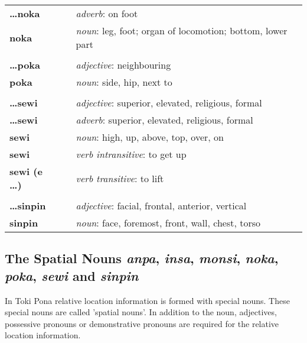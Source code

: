 \begin{supertabular}{p{2,5cm}|ll}
    \textbf{ \dots noka }   &  & \textit{adverb}: on foot                                                          \\
    \textbf{noka}           &  & \textit{noun}: leg, foot; organ of locomotion; bottom, lower part                 \\
                            &  &                                                                                   \\
    \textbf{\dots poka}     &  & \textit{adjective}: neighbouring                                                  \\
    \textbf{poka}           &  & \textit{noun}: side, hip, next to                                                 \\
                            &  &                                                                                   \\
    \textbf{\dots sewi}     &  & \textit{adjective}: superior, elevated, religious, formal                         \\
    \textbf{\dots sewi}     &  & \textit{adverb}: superior, elevated, religious, formal                            \\
    \textbf{sewi}           &  & \textit{noun}: high, up, above, top, over, on                                     \\
    \textbf{sewi}           &  & \textit{verb intransitive}: to get up                                             \\
    \textbf{sewi (e \dots)} &  & \textit{verb transitive}: to lift                                                 \\
                            &  &                                                                                   \\
    \textbf{\dots sinpin}   &  & \textit{adjective}: facial, frontal, anterior, vertical                           \\
    \textbf{sinpin}         &  & \textit{noun}: face, foremost, front, wall, chest, torso                          \\
\end{supertabular}

\newpage

\subsection*{The Spatial Nouns \textit{anpa}, \textit{insa}, \textit{monsi}, \textit{noka}, \textit{poka}, \textit{sewi} and \textit{sinpin}}
In Toki Pona relative location information is formed with special nouns.
These special nouns are called 'spatial nouns'.
In addition to the noun, adjectives, possessive pronouns or demonstrative pronouns are required for the relative location information.

